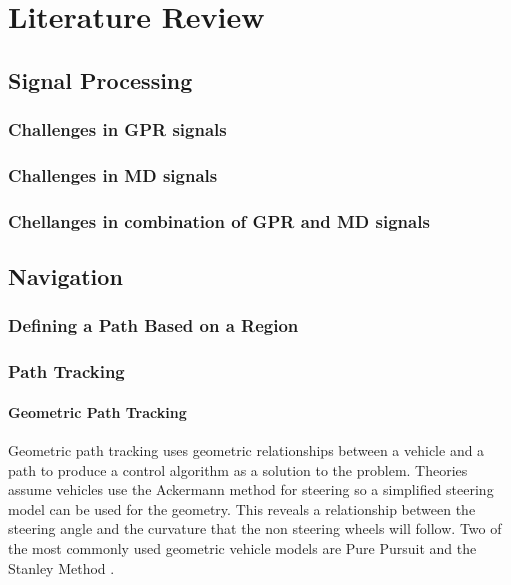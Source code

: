\documentclass[main.tex]{subfiles}
\begin{document}
\chapter{Literature Review}
\section{Signal Processing}
% 
\subsection{Challenges in GPR signals}
\subsection{Challenges in MD signals}
\subsection{Chellanges in combination of GPR and MD signals}


\section{Navigation}
\subsection{Defining a Path Based on a Region}
\textbf{\color{red}{JONO CAN YOU TALK ABOUT DIFFERENT METHODS DO DEFINE A PATH BASED ON A REGION HERE, or maybe we dont even need to mention it, put in detailed design?}}

\subsection{Path Tracking}
\subsubsection{Geometric Path Tracking}
Geometric path tracking uses geometric relationships between a vehicle and a path to produce a control algorithm as a solution to the problem. Theories assume vehicles use the Ackermann method for steering so a simplified steering model can be used for the geometry. This reveals a relationship between the steering angle and the curvature that the non steering wheels will follow. Two of the most commonly used geometric vehicle models are Pure Pursuit and the Stanley Method \parencite{snider2009}.
\end{document}
